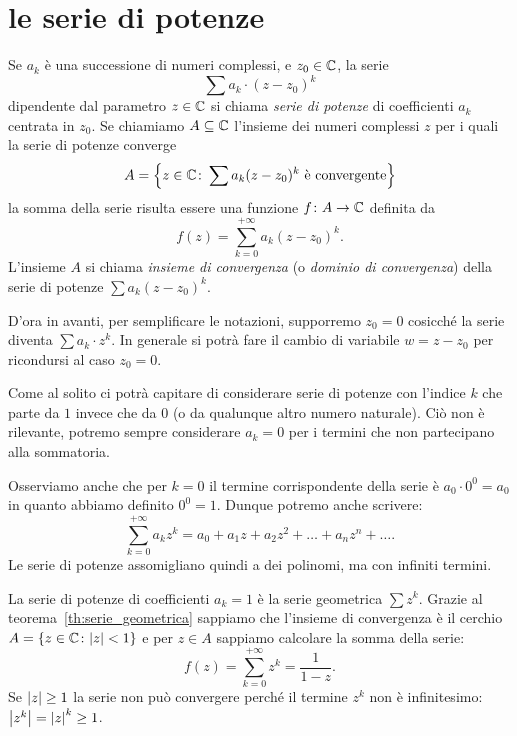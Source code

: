 \section{le serie di potenze}

Se $a_k$ è una successione di numeri complessi, e $z_0\in {\mathbb C}$, 
la serie
\[
 \sum a_k \cdot (z-z_0)^k
\]
dipendente dal parametro $z\in {\mathbb C}$ si chiama
\emph{serie di potenze}%
%
di coefficienti $a_k$ centrata in $z_0$.
Se chiamiamo $A\subseteq {\mathbb C}$ l'insieme dei numeri complessi $z$
per i quali la serie di potenze converge
\[
A= {\left\{ z\in {\mathbb C} \colon \sum a_k (z-z_0)^k \text{ è convergente} \right\}}
\]
la somma della serie risulta essere una funzione
$f \colon A \to {\mathbb C}$ definita da
\[
  f(z) = \sum_{k=0}^{+\infty} a_k (z-z_0)^k.
\]
L'insieme $A$ si chiama \emph{insieme di convergenza}%
%
(o \emph{dominio di convergenza}) della serie
di potenze $\sum a_k (z-z_0)^k$.

D'ora in avanti, per semplificare le notazioni, 
supporremo $z_0=0$ cosicché 
la serie diventa $\sum a_k \cdot z^k$. 
In generale si potrà fare il cambio di variabile $w=z-z_0$ 
per ricondursi al caso $z_0=0$.

Come al solito ci potrà capitare di considerare serie
di potenze con l'indice $k$ che parte da $1$ invece che da $0$
(o da qualunque altro numero naturale).
Ciò non è rilevante, potremo sempre considerare $a_k=0$ per i termini
che non partecipano alla sommatoria.

Osserviamo anche che per $k=0$ il termine corrispondente della serie è
$a_0 \cdot 0^0 = a_0$ in
quanto abbiamo definito $0^0=1$. Dunque potremo anche scrivere:
\[
  \sum_{k=0}^{+\infty} a_k z^k = a_0 + a_1 z + a_2 z^2 + \dots + a_n z^n + \dots.
\]
Le serie di potenze assomigliano quindi a dei polinomi, ma con infiniti termini.

\begin{example}
La serie di potenze di coefficienti $a_k=1$ è la
serie geometrica $\sum z^k$.
Grazie al teorema~\ref{th:serie_geometrica} 
sappiamo che l'insieme di convergenza è il cerchio
$A={\left\{ z\in {\mathbb C} \colon {\left|z\right|}<1 \right\}}$
e per $z\in A$ sappiamo calcolare la somma della serie:
\[
 f(z) = \sum_{k=0}^{+\infty} z^k  = \frac{1}{1-z}.
\]
Se ${\left|z\right|}\ge 1$ la serie non può convergere perché il termine $z^k$ non è
infinitesimo: ${\left|z^k\right|} = {\left|z\right|}^k \ge 1$.
\end{example}

